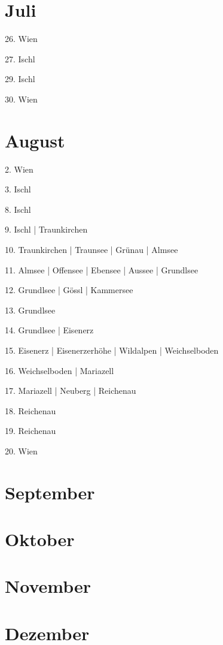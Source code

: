 \documentclass[twoside=false,titlepage=false,open=any, parskip=never, fontsize=10pt, headings=small, chapterprefix=false, appendixprefix=false, DIV=15]{scrbook}
\begin{document}
\begin{multicols}{3}
            \section*{Juli}
            26. Wien\par
            27. Ischl\par
            29. Ischl\par
            30. Wien\par
            \section*{August}
            2. Wien\par
            3. Ischl\par
            8. Ischl\par
            9. Ischl | Traunkirchen\par
            10. Traunkirchen | Traunsee | Grünau | Almsee\par
            11. Almsee | Offensee | Ebensee | Aussee | Grundlsee\par
            12. Grundlsee | Gössl | Kammersee\par
            13. Grundlsee\par
            14. Grundlsee | Eisenerz\par
            15. Eisenerz | Eisenerzerhöhe | Wildalpen | Weichselboden\par
            16. Weichselboden | Mariazell\par
            17. Mariazell | Neuberg | Reichenau\par
            18. Reichenau\par
            19. Reichenau\par
            20. Wien\par
            \section*{September}
            \section*{Oktober}
            \section*{November}
            \section*{Dezember}

\end{multicols}
\end{document}
